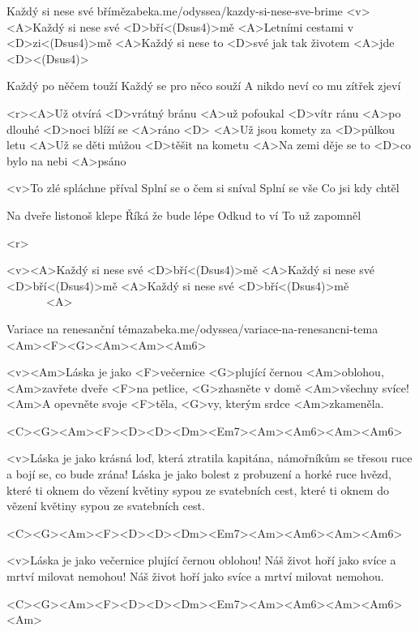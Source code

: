\begin{song}{29}{Každý si nese své břímě}{zabeka.me/odyssea/kazdy-si-nese-sve-brime}
	<v><A>Každý si nese své <D>bří<(Dsus4)>mě
	<A>Letními cestami v <D>zi<(Dsus4)>mě
	<A>Každý si nese to <D>své
	jak tak životem <A>jde <D><(Dsus4)>

	Každý po něčem touží
	Každý se pro něco souží
	A nikdo neví
	co mu zítřek zjeví

	<r><A>Už otvírá <D>vrátný bránu
	<A>už pofoukal <D>vítr ránu
	<A>po dlouhé <D>noci blíží se <A>ráno <D>
	<A>Už jsou komety za <D>půlkou letu
	<A>Už se děti můžou <D>těšit na kometu
	<A>Na zemi děje se to <D>co bylo na nebi <A>psáno

	<v>To zlé spláchne příval
	Splní se o čem si sníval
	Splní se vše
	Co jsi kdy chtěl

	Na dveře listonoš klepe
	Říká že bude lépe
	Odkud to ví
	To už zapomněl

	<r>

	<v><A>Každý si nese své <D>bří<(Dsus4)>mě
	<A>Každý si nese své <D>bří<(Dsus4)>mě
	<A>Každý si nese své <D>bří<(Dsus4)>mě \ \ \ \ \ \ \ <A>
\end{song}
\begin{song}{30}{Variace na renesanční téma}{zabeka.me/odyssea/variace-na-renesancni-tema}
	<Am><F><G><Am><Am><Am6>

	<v><Am>Láska je jako <F>večernice <G>plující černou <Am>oblohou,
	<Am>zavřete dveře <F>na petlice, <G>zhasněte v domě <Am>všechny svíce!
	<Am>A opevněte svoje <F>těla, <G>vy, kterým srdce <Am>zkameněla.

	<C><G><Am><F><D><D><Dm><Em7><Am><Am6><Am><Am6>

	<v>Láska je jako krásná loď, která ztratila kapitána,
	námořníkům se třesou ruce a bojí se, co bude zrána!
	Láska je jako bolest z probuzení a horké ruce hvězd,
	které ti oknem do vězení květiny sypou ze svatebních cest,
	které ti oknem do vězení květiny sypou ze svatebních cest.

	<C><G><Am><F><D><D><Dm><Em7><Am><Am6><Am><Am6>

	<v>Láska je jako večernice plující černou oblohou!
	Náš život hoří jako svíce a mrtví milovat nemohou!
	Náš život hoří jako svíce a mrtví milovat nemohou.

	<C><G><Am><F><D><D><Dm><Em7><Am><Am6><Am><Am6><Am>

\end{song}
